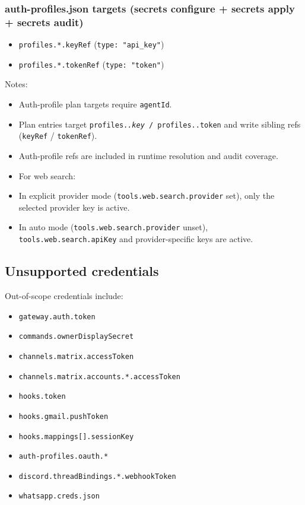 \subsubsection{auth-profiles.json targets (secrets configure + secrets apply + secrets audit)}


\begin{itemize}
  \item \texttt{profiles.*.keyRef} (\texttt{type: "api\_key"})
  \item \texttt{profiles.*.tokenRef} (\texttt{type: "token"})
\end{itemize}


Notes:

\begin{itemize}
  \item Auth-profile plan targets require \texttt{agentId}.
  \item Plan entries target \texttt{profiles.\textit{.key} / \texttt{profiles.}.token} and write sibling refs (\texttt{keyRef} / \texttt{tokenRef}).
  \item Auth-profile refs are included in runtime resolution and audit coverage.
  \item For web search:
  \item In explicit provider mode (\texttt{tools.web.search.provider} set), only the selected provider key is active.
  \item In auto mode (\texttt{tools.web.search.provider} unset), \texttt{tools.web.search.apiKey} and provider-specific keys are active.
\end{itemize}


\subsection{Unsupported credentials}


Out-of-scope credentials include:


\begin{itemize}
  \item \texttt{gateway.auth.token}
  \item \texttt{commands.ownerDisplaySecret}
  \item \texttt{channels.matrix.accessToken}
  \item \texttt{channels.matrix.accounts.*.accessToken}
  \item \texttt{hooks.token}
  \item \texttt{hooks.gmail.pushToken}
  \item \texttt{hooks.mappings[].sessionKey}
  \item \texttt{auth-profiles.oauth.*}
  \item \texttt{discord.threadBindings.*.webhookToken}
  \item \texttt{whatsapp.creds.json}
\end{itemize}


